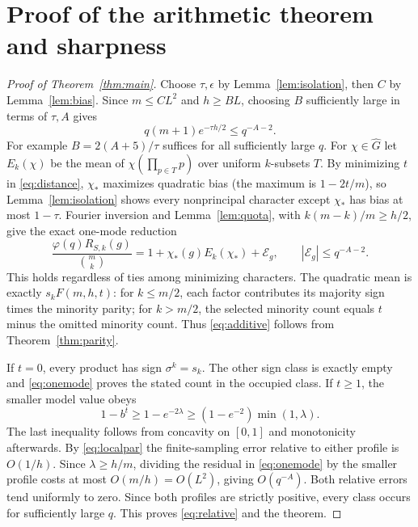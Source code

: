 \documentclass[11pt]{article}
\theoremstyle{remark}\newtheorem{remark}[theorem]{Remark}
\newcommand{\normcount}{\frac{\varphi(q)R_{S,k}(g)}{\binom mk}}
\begin{document}
\section{Proof of the arithmetic theorem and sharpness}
\begin{proof}[Proof of Theorem~\ref{thm:main}]
Choose $\tau,\epsilon$ by Lemma~\ref{lem:isolation}, then $C$ by Lemma~\ref{lem:bias}. Since $m\le C L^2$ and $h\ge BL$, choosing $B$ sufficiently large in terms of $\tau,A$ gives
\begin{equation}\label{eq:remainder}
 q(m+1)e^{-\tau h/2}\le q^{-A-2}.
\end{equation}
For example $B=2(A+5)/\tau$ suffices for all sufficiently large $q$. For $\chi\in\widehat G$ let $E_k(\chi)$ be the mean of $\chi(\prod_{p\in T}p)$ over uniform $k$-subsets $T$. By minimizing $t$ in \eqref{eq:distance}, $\chi_*$ maximizes quadratic bias (the maximum is $1-2t/m$), so Lemma~\ref{lem:isolation} shows every nonprincipal character except $\chi_*$ has bias at most $1-\tau$. Fourier inversion and Lemma~\ref{lem:quota}, with $k(m-k)/m\ge h/2$, give the exact one-mode reduction
\begin{equation}\label{eq:onemode}
 \normcount=1+\chi_*(g) E_k(\chi_*)+\mathcal E_g,
 \qquad |\mathcal E_g|\le q^{-A-2}.
\end{equation}
This holds regardless of ties among minimizing characters. The quadratic mean is exactly $s_k F(m,h,t)$: for $k\le m/2$, each factor contributes its majority sign times the minority parity; for $k>m/2$, the selected minority count equals $t$ minus the omitted minority count. Thus \eqref{eq:additive} follows from Theorem~\ref{thm:parity}.

If $t=0$, every product has sign $\sigma^k=s_k$. The other sign class is exactly empty and \eqref{eq:onemode} proves the stated count in the occupied class. If $t\ge1$, the smaller model value obeys
\begin{equation}\label{eq:minprofile}
 1-b^t\ge1-e^{-2\lambda}\ge (1-e^{-2})\min(1,\lambda).
\end{equation}
The last inequality follows from concavity on $[0,1]$ and monotonicity afterwards. By \eqref{eq:localpar} the finite-sampling error relative to either profile is $O(1/h)$. Since $\lambda\ge h/m$, dividing the residual in \eqref{eq:onemode} by the smaller profile costs at most $O(m/h)=O(L^2)$, giving $O(q^{-A})$. Both relative errors tend uniformly to zero. Since both profiles are strictly positive, every class occurs for sufficiently large $q$. This proves \eqref{eq:relative} and the theorem.
\end{proof}
\end{document}
